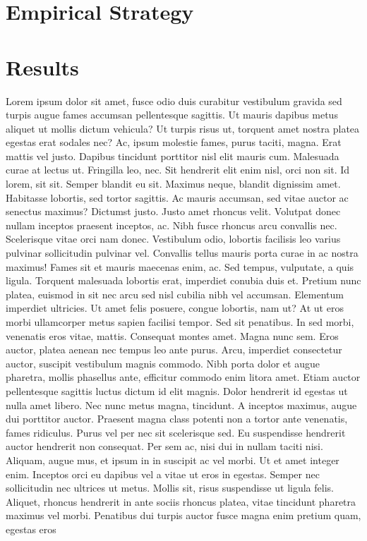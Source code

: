 \documentclass[
  12pt,
]{article}
\begin{document}
\hypertarget{strat}{%
\section{Empirical Strategy}\label{strat}}

\hypertarget{res}{%
\section{Results}\label{res}}

Lorem ipsum dolor sit amet, fusce odio duis curabitur vestibulum gravida sed turpis augue fames accumsan pellentesque sagittis. Ut mauris dapibus metus aliquet ut mollis dictum vehicula? Ut turpis risus ut, torquent amet nostra platea egestas erat sodales nec? Ac, ipsum molestie fames, purus taciti, magna. Erat mattis vel justo. Dapibus tincidunt porttitor nisl elit mauris cum. Malesuada curae at lectus ut. Fringilla leo, nec. Sit hendrerit elit enim nisl, orci non sit. Id lorem, sit sit. Semper blandit eu sit. Maximus neque, blandit dignissim amet. Habitasse lobortis, sed tortor sagittis. Ac mauris accumsan, sed vitae auctor ac senectus maximus? Dictumst justo. Justo amet rhoncus velit. Volutpat donec nullam inceptos praesent inceptos, ac. Nibh fusce rhoncus arcu convallis nec. Scelerisque vitae orci nam donec. Vestibulum odio, lobortis facilisis leo varius pulvinar sollicitudin pulvinar vel. Convallis tellus mauris porta curae in ac nostra maximus! Fames sit et mauris maecenas enim, ac. Sed tempus, vulputate, a quis ligula. Torquent malesuada lobortis erat, imperdiet conubia duis et. Pretium nunc platea, euismod in sit nec arcu sed nisl cubilia nibh vel accumsan. Elementum imperdiet ultricies. Ut amet felis posuere, congue lobortis, nam ut? At ut eros morbi ullamcorper metus sapien facilisi tempor. Sed sit penatibus. In sed morbi, venenatis eros vitae, mattis. Consequat montes amet. Magna nunc sem. Eros auctor, platea aenean nec tempus leo ante purus. Arcu, imperdiet consectetur auctor, suscipit vestibulum magnis commodo. Nibh porta dolor et augue pharetra, mollis phasellus ante, efficitur commodo enim litora amet. Etiam auctor pellentesque sagittis luctus dictum id elit magnis. Dolor hendrerit id egestas ut nulla amet libero. Nec nunc metus magna, tincidunt. A inceptos maximus, augue dui porttitor auctor. Praesent magna class potenti non a tortor ante venenatis, fames ridiculus. Purus vel per nec sit scelerisque sed. Eu suspendisse hendrerit auctor hendrerit non consequat. Per sem ac, nisi dui in nullam taciti nisi. Aliquam, augue mus, et ipsum in in suscipit ac vel morbi. Ut et amet integer enim. Inceptos orci eu dapibus vel a vitae ut eros in egestas. Semper nec sollicitudin nec ultrices ut metus. Mollis sit, risus suspendisse ut ligula felis. Aliquet, rhoncus hendrerit in ante sociis rhoncus platea, vitae tincidunt pharetra maximus vel morbi. Penatibus dui turpis auctor fusce magna enim pretium quam, egestas eros 
\end{document}
